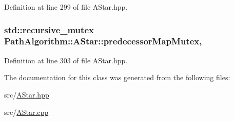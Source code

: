 Definition at line 299 of file A\+Star.\+hpp.

\subsubsection[{\texorpdfstring{predecessor\+Map\+Mutex}{predecessorMapMutex}}]{\setlength{\rightskip}{0pt plus 5cm}std\+::recursive\+\_\+mutex Path\+Algorithm\+::\+A\+Star\+::predecessor\+Map\+Mutex\hspace{0.3cm}{\ttfamily [mutable]}, {\ttfamily [private]}}\hypertarget{class_path_algorithm_1_1_a_star_ac69b08a85dfe16b7571b33fb9231f9c1}{}\label{class_path_algorithm_1_1_a_star_ac69b08a85dfe16b7571b33fb9231f9c1}


Definition at line 303 of file A\+Star.\+hpp.



The documentation for this class was generated from the following files\+:\begin{DoxyCompactItemize}
\item 
src/\hyperlink{_a_star_8hpp}{A\+Star.\+hpp}\item 
src/\hyperlink{_a_star_8cpp}{A\+Star.\+cpp}\end{DoxyCompactItemize}
